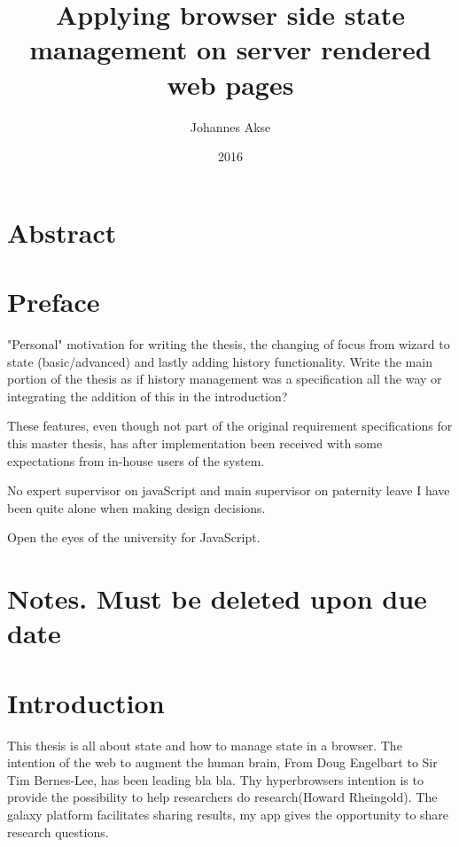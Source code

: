 \documentclass[english]{ifimaster}
\title{Applying browser side state management on server rendered web pages}
\subtitle{}
\author{Johannes Akse}
\date{2016}
\begin{document}
\maketitle{}
\chapter*{Abstract}

\tableofcontents
\nocite{*}

\chapter*{Preface}
"Personal" motivation for writing the thesis, the changing of focus from wizard to state (basic/advanced) and lastly adding history functionality. Write the main portion of the thesis as if history management was a specification all the way or integrating the addition of this in the introduction?

These features, even though not part of the original requirement specifications for this master thesis, has after implementation been received with some expectations from in-house users of the system. 

No expert supervisor on javaScript and main supervisor on paternity leave I have been quite alone when making design decisions. 

Open the eyes of the university for JavaScript.
\chapter*{Notes. Must be deleted upon due date}

   


\chapter{Introduction}
This thesis is all about state and how to manage state in a browser.
The intention of the web to augment the human brain, From Doug Engelbart to Sir Tim Bernes-Lee, has been leading bla bla. Thy hyperbrowsers intention is to provide the possibility to help researchers do research(Howard Rheingold). The galaxy platform facilitates sharing results, my app gives the opportunity to share research questions.  
\end{document}
